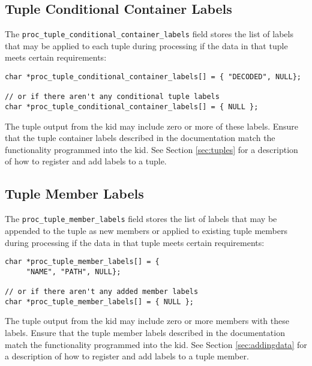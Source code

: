 \documentclass[11pt]{article}
\begin{document}
\subsection{Tuple Conditional Container Labels}
The \texttt{proc\_tuple\_conditional\_container\_labels} field stores the list of labels that may be applied to each
tuple during processing if the data in that tuple meets certain requirements:
\begin{lstlisting}
char *proc_tuple_conditional_container_labels[] = { "DECODED", NULL};

// or if there aren't any conditional tuple labels
char *proc_tuple_conditional_container_labels[] = { NULL };
\end{lstlisting}
The tuple output from the kid may include zero or more of these labels. Ensure that the tuple container labels described
in the documentation match the functionality programmed into the kid. See Section \ref{sec:tuples} for a description of
how to register and add labels to a tuple.

\subsection{Tuple Member Labels}
The \texttt{proc\_tuple\_member\_labels} field stores the list of labels that may be appended to the tuple as new
members or applied to existing tuple members during processing if the data in that tuple meets certain requirements:
\begin{lstlisting}
char *proc_tuple_member_labels[] = {
     "NAME", "PATH", NULL};

// or if there aren't any added member labels
char *proc_tuple_member_labels[] = { NULL };
\end{lstlisting}
The tuple output from the kid may include zero or more members with these labels. Ensure that the tuple member labels
described in the documentation match the functionality programmed into the kid. See Section \ref{sec:addingdata} for a
description of how to register and add labels to a tuple member.
\end{document}
